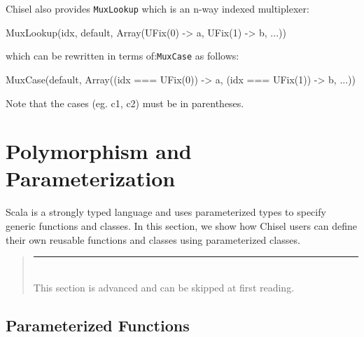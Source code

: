 \documentclass[twocolumn,10pt]{article}
\newenvironment{commentary}
{ \vspace{-0.1in}
  \begin{quotation}
  \noindent
  \small \em
  \rule{\linewidth}{1pt}\\
}
{
  \end{quotation}
}
\def\code#1{{\tt #1}}
\begin{document}
\noindent
Chisel also provides \code{MuxLookup} which is an n-way indexed multiplexer:

\begin{scala}
MuxLookup(idx, default, 
          Array(UFix(0) -> a, UFix(1) -> b, ...))
\end{scala}

\noindent
which can be rewritten in terms of:\verb+MuxCase+ as follows:

\begin{scala}
MuxCase(default, 
        Array((idx === UFix(0)) -> a, 
              (idx === UFix(1)) -> b, ...))
\end{scala}

\noindent
Note that the cases (eg. c1, c2) must be in parentheses.



%
%




\section{Polymorphism and Parameterization}
\label{sec:parameterization}

Scala is a strongly typed language and uses parameterized types to specify generic functions and classes.  
In this section, we show how Chisel users can define their own reusable functions and classes using parameterized classes.
\begin{commentary}
This section is advanced and can be skipped at first reading.
\end{commentary}

\subsection{Parameterized Functions}
\end{document}
